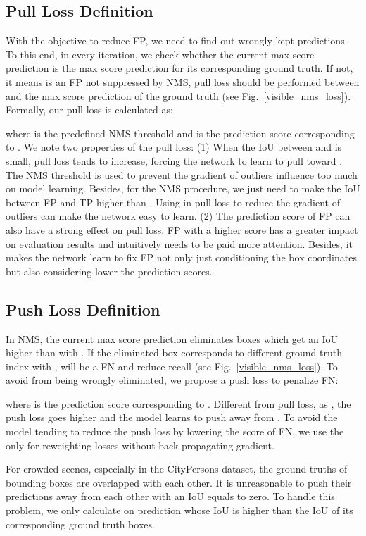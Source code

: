 \documentclass[sigconf]{acmart}
\begin{document}
\subsection{Pull Loss Definition}
With the objective to reduce FP, we need to find out wrongly kept predictions. To this end, in every iteration, we check whether the current max score prediction  is the max score prediction for its corresponding  ground truth. If not, it means  is an FP not suppressed by NMS, pull loss should be performed between  and the max score prediction  of the  ground truth (see Fig.~\ref{visible_nms_loss}). Formally, our pull loss is calculated as:

where  is the predefined NMS threshold and  is the prediction score corresponding to . We note two properties of the pull  loss: (1) When the IoU between  and  is small, pull loss tends to increase, forcing the network to learn to pull  toward . The NMS threshold  is used to prevent the gradient of outliers influence too much on model learning. Besides, for the NMS procedure, we just need to make the IoU between FP and TP higher than . Using  in pull loss to reduce the gradient of outliers can make the network easy to learn. (2) The prediction score of FP can also have a strong effect on pull loss. FP with a higher score has a greater impact on evaluation results and intuitively needs to be paid more attention. Besides, it makes the network learn to fix FP not only just conditioning the box coordinates but also considering lower the prediction scores.

\subsection{Push Loss Definition}
In NMS, the current max score prediction  eliminates boxes which get an IoU higher than  with . If the eliminated box  corresponds to different ground truth index with ,  will be a FN and reduce recall (see Fig.~\ref{visible_nms_loss}). To avoid  from being wrongly eliminated, we propose a push loss to penalize FN:

where  is the prediction score corresponding to . Different from pull loss, as , the push loss goes higher and the model learns to push  away from . To avoid the model tending to reduce the push loss by lowering the score of FN, we use the  only for reweighting losses without back propagating gradient.

For crowded scenes, especially in the CityPersons dataset, the ground truths of bounding boxes are overlapped with each other.
It is unreasonable to push their predictions away from each other with an IoU equals to zero. To handle this problem, we only calculate  on prediction whose IoU is higher than the IoU of its corresponding ground truth boxes.
\end{document}

